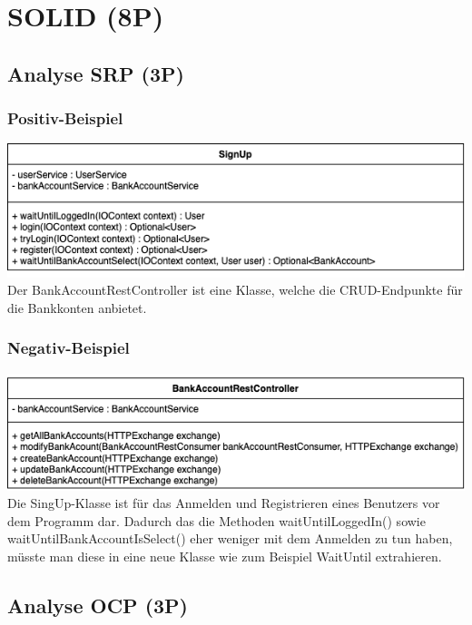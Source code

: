 \section{SOLID (8P)}
\subsection{Analyse SRP (3P)}
\subsubsection*{Positiv-Beispiel}
\includegraphics[width=\linewidth]{kapitel3_solid/SignUp.png}
Der BankAccountRestController ist eine Klasse, welche die CRUD-Endpunkte für die Bankkonten anbietet.
\subsubsection*{Negativ-Beispiel}
\includegraphics[width=\linewidth]{kapitel3_solid/BankAccountRestController.png}
Die SingUp-Klasse ist für das Anmelden und Registrieren eines Benutzers vor dem Programm dar. Dadurch das die Methoden waitUntilLoggedIn() sowie waitUntilBankAccountIsSelect() eher weniger mit dem Anmelden zu tun haben, müsste man diese in eine neue Klasse wie zum Beispiel WaitUntil extrahieren. 

\subsection{Analyse OCP (3P)}

